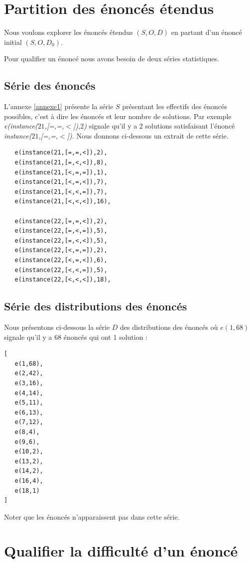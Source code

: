 \documentclass[a4paper, 12]{article}
\begin{document}
\section{Partition des énoncés étendus}

Nous voulons explorer les énoncés étendus $(S, O, D)$ en partant d’un énoncé initial $(S, O, D_0)$.

Pour qualifier un énoncé nous avons besoin de deux séries statistiques.

\subsection{Série des énoncés }

L'annexe \ref{annexe1} présente la série $S$ présentant les effectifs des énoncés possibles, c'est à dire les énoncés et leur nombre de solutions.
Par exemple \emph{e(instance($21$,[=,=,$<$]),$2$)} signale qu'il y a 2 solutions satisfaisant l'énoncé  \emph{instance($21$,[=,=,$<$])}.
Nous donnons ci-dessous un extrait de cette série.
\begin{verbatim}
   e(instance(21,[=,=,<]),2),
   e(instance(21,[=,<,<]),8),
   e(instance(21,[<,=,=]),1),
   e(instance(21,[<,=,<]),7),
   e(instance(21,[<,<,=]),7),
   e(instance(21,[<,<,<]),16),
   
   e(instance(22,[=,=,<]),2),
   e(instance(22,[=,<,=]),5),
   e(instance(22,[=,<,<]),5),
   e(instance(22,[<,=,=]),2),
   e(instance(22,[<,=,<]),6),
   e(instance(22,[<,<,=]),5),
   e(instance(22,[<,<,<]),18),
\end{verbatim}

\subsection{Série des distributions des énoncés}
Nous présentons ci-dessous la série $D$ des distributions des énoncés où $e(1,68)$ signale qu'il y a 68 énoncés qui ont 1 solution :
\begin{verbatim}
[
   e(1,68),
   e(2,42),
   e(3,16),
   e(4,14),
   e(5,11),
   e(6,13),
   e(7,12),
   e(8,4),
   e(9,6),
   e(10,2),
   e(13,2),
   e(14,2),
   e(16,4),
   e(18,1)
]
\end{verbatim}

Noter que les énoncés n'apparaissent pas dans cette série.


\section{Qualifier la difficulté d'un énoncé}
\end{document}
